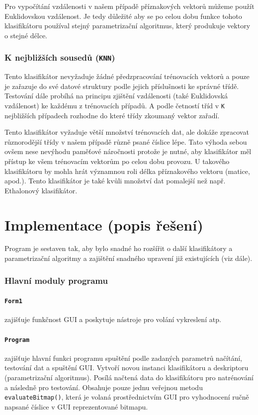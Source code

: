 \documentclass[12pt]{article}
\begin{document}
Pro vypočítání vzdálenosti v našem případě příznakových vektorů můžeme použít Euklidovskou vzdálenost. Je tedy důležité aby se po celou dobu funkce tohoto klasifikátoru používal stejný parametrizační algoritmus, který produkuje vektory o stejné délce.

\subsubsection{K nejbližších sousedů (\texttt{KNN})}
Tento klasifikátor nevyžaduje žádné předzpracování trénovacích vektorů a pouze je zařazuje do své datové struktury podle jejich příslušnosti ke správné třídě. Testování dále probíhá na principu zjištění vzdálenosti (také Euklidovská vzdálenost) ke každému z trénovacích případů. A podle četností tříd v \texttt{K} nejbližších případech rozhodne do které třídy zkoumaný vektor zařadí.

Tento klasifikátor vyžaduje větší množství trénovacích dat, ale dokáže zpracovat různorodější třídy v našem případě různě psané číslice lépe. Tato výhoda sebou ovšem nese nevýhodu paměťové náročnosti protože je nutné, aby klasifikátor měl přístup ke všem trénovacím vektorům po celou dobu provozu. U takového klasifikátoru by mohla hrát významnou roli délka příznakového vektoru (matice, apod.). Tento klasifikátor je také kvůli množství dat pomalejší než např. Ethalonový klasifikátor.

\section{Implementace (popis řešení)}
Program je sestaven tak, aby bylo snadné ho rozšířit o další klasifikátory a parametrizační algoritmy a zajištění snadného upravení již existujících (viz dále).

\subsubsection{Hlavní moduly programu} 

\paragraph{\texttt{Form1}}
zajišťuje funkčnost GUI a poskytuje nástroje pro volání vykreslení atp.

\paragraph{\texttt{Program}}
zajišťuje hlavní funkci programu spuštění podle zadaných parametrů načítání, testování dat a spuštění GUI. Vytvoří novou instanci klasifikátoru a deskriptoru (parametrizační algoritmus). Posílá načtená data do klasifikátoru pro natrénování a následně pro testování. Obsahuje pouze jednu veřejnou metodu \texttt{evaluateBitmap()}, která je volaná prostřednictvím GUI pro vyhodnocení ručně napsané číslice v GUI reprezentované bitmapu.
\end{document}
